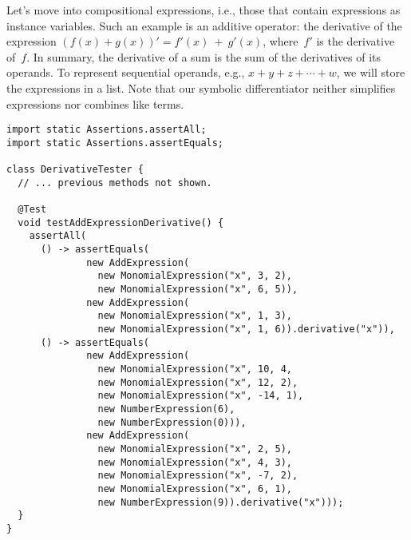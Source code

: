 Let's move into compositional expressions, i.e., those that contain expressions as instance variables. 
Such an example is an additive operator: the derivative of the expression $(f(x) + g(x))' = f'(x)~+~g'(x)$, where~$f'$ is the derivative of~$f$. 
In summary, the derivative of a sum is the sum of the derivatives of its operands. 
To represent sequential operands, e.g., $x + y + z + \cdots + w$, we will store the expressions in a list. 
Note that our symbolic differentiator neither simplifies expressions nor combines like terms.

\begin{lstlisting}[language=MyJava]
import static Assertions.assertAll;
import static Assertions.assertEquals;
  
class DerivativeTester {
  // ... previous methods not shown.

  @Test
  void testAddExpressionDerivative() {
    assertAll(
      () -> assertEquals(
              new AddExpression(
                new MonomialExpression("x", 3, 2),
                new MonomialExpression("x", 6, 5)),
              new AddExpression(
                new MonomialExpression("x", 1, 3),
                new MonomialExpression("x", 1, 6)).derivative("x")),
      () -> assertEquals(
              new AddExpression(
                new MonomialExpression("x", 10, 4,
                new MonomialExpression("x", 12, 2),
                new MonomialExpression("x", -14, 1),
                new NumberExpression(6),
                new NumberExpression(0))),
              new AddExpression(
                new MonomialExpression("x", 2, 5),
                new MonomialExpression("x", 4, 3),
                new MonomialExpression("x", -7, 2),
                new MonomialExpression("x", 6, 1),
                new NumberExpression(9)).derivative("x")));
  }
}
\end{lstlisting}

